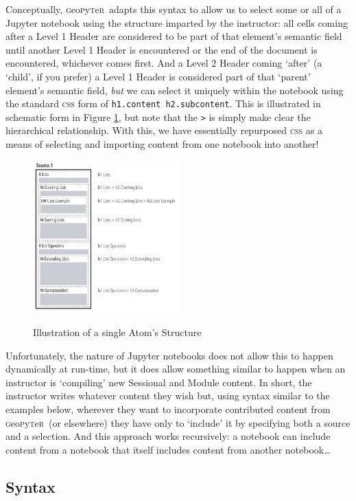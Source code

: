 \documentclass[letter, 11pt,titlepage]{article}
\newcommand{\gp}{\textsc{g}eo\textsc{p}y\textsc{t}e\textsc{r}~\/}
\begin{document}
Conceptually, \gp adapts this syntax to allow us to select some or all of a Jupyter notebook using the structure imparted by the instructor: all cells coming after a Level 1 Header are considered to be part of that element's semantic field until another Level 1 Header is encountered or the end of the document is encountered, whichever comes first. And a Level 2 Header coming `after' (a `child', if you prefer) a Level 1 Header is considered part of that `parent' element's semantic field, \emph{but} we can select it uniquely within the notebook using the standard \textsc{css} form of \texttt{h1.content h2.subcontent}. This is illustrated in schematic form in Figure \ref{fig:structure}, but note that the \texttt{>} is simply make clear the hierarchical relationship. With this, we have essentially repurposed \textsc{css} as a means of selecting and importing content from one notebook into another!

\begin{figure}[htbp]
  \centering
  \caption{Illustration of a single Atom's Structure}
  \includegraphics[width=0.5\textwidth]{Single_Document.pdf}
  \label{fig:structure}
\end{figure}

Unfortunately, the nature of Jupyter notebooks does not allow this to happen dynamically at run-time, but it does allow something similar to happen when an instructor is `compiling' new Sessional and Module content. In short, the instructor writes whatever content they wish but, using syntax similar to the examples below, wherever they want to incorporate contributed content from \gp (or elsewhere) they have only to `include' it by specifying both a source and a selection. And this approach works recursively: a notebook can include content from a notebook that itself includes content from another notebook\ldots

\subsection{Syntax}\label{syntax}
\end{document}
